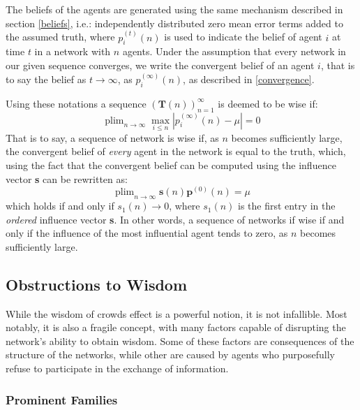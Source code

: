 \documentclass{article}
\DeclareMathOperator*{\plim}{plim}
\newcommand{\T}{\textbf{T}}
\newcommand{\Soc}{(\T(n))^{\infty}_{n=1}}
\newcommand{\beli}[3][2]{p_{#2}^{(#3)}}
\begin{document}
The beliefs of the agents are generated using the same mechanism described in section \ref{beliefs}, i.e.: independently distributed zero mean error terms added to the assumed truth, where $\beli{i}{t}(n)$ is used to indicate the belief of agent $i$ at time $t$ in a network with $n$ agents. Under the assumption that every network in our given sequence converges, we write the convergent belief of an agent $i$, that is to say the belief as $t \to\infty$, as $\beli{i}{\infty}(n)$, as described in \ref{convergence}.

Using these notations a sequence $\Soc$ is deemed to be wise if:
\begin{equation}
    \label{wisdom:equation}
    \plim_{n\to\infty}\max_{i \leq n}|\beli{i}{\infty}(n) - \mu| = 0
\end{equation}
That is to say, a sequence of network is wise if, as $n$ becomes sufficiently large, the convergent belief of \emph{every} agent in the network is equal to the truth, which, using the fact that the convergent belief can be computed using the influence vector \textbf{s} can be rewritten as:
\begin{equation}
    \label{wisdom:influence}
    \plim_{n\to\infty} \textbf{s}(n)\textbf{p}^{(0)}(n) = \mu
\end{equation}
which holds if and only if $s_{1}(n) \to 0$, where $s_1(n)$ is the first entry in the \emph{ordered} influence vector \textbf{s}. In other words, a sequence of networks if wise if and only if the influence of the most influential agent tends to zero, as $n$ becomes sufficiently large.

\newpage

\subsection{Obstructions to Wisdom}
While the wisdom of crowds effect is a powerful notion, it is not infallible. Most notably, it is also a fragile concept, with many factors capable of disrupting the network's ability to obtain wisdom. Some of these factors are consequences of the structure of the networks, while other are caused by agents who purposefully refuse to participate in the exchange of information.

\subsubsection{Prominent Families}
\end{document}
